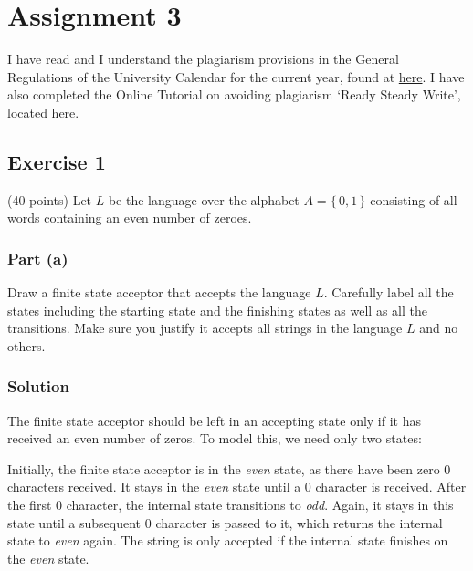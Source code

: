 \documentclass[12pt]{article}
\begin{document}
\section*{Assignment 3}

I have read and I understand the plagiarism provisions in the General Regulations of the University Calendar for the current year, found at \href{http://www.tcd.ie/calendar}{here}.
I have also completed the Online Tutorial on avoiding plagiarism ‘Ready Steady Write’, located \href{http://tcd-ie.libguides.com/plagiarism/ready-steady-write}{here}.

\subsection*{Exercise 1}

(40 points) Let $L$ be the language over the alphabet $A=\{\,0,1\,\}$ consisting of all words containing an even number of zeroes.

\subsubsection*{Part (a)}

Draw a finite state acceptor that accepts the language $L$.
Carefully label all the states including the starting state and the finishing states as well as all the transitions.
Make sure you justify it accepts all strings in the language $L$ and no others.

\subsubsection*{Solution}

The finite state acceptor should be left in an accepting state only if it has received an even number of zeros.
To model this, we need only two states:

\begin{figure}[ht]
	\centering
\end{figure}

Initially, the finite state acceptor is in the \textit{even} state, as there have been zero 0 characters received.
It stays in the \textit{even} state until a 0 character is received.
After the first 0 character, the internal state transitions to \textit{odd}.
Again, it stays in this state until a subsequent 0 character is passed to it, which returns the internal state to \textit{even} again.
The string is only accepted if the internal state finishes on the \textit{even} state.
\end{document}
